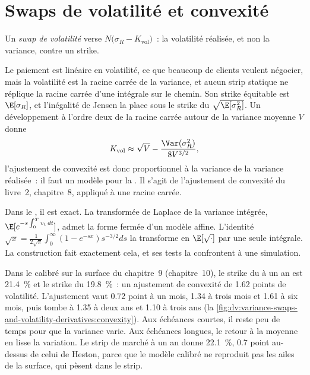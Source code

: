 \section{Swaps de volatilité et convexité}

\begin{definition}\label{def:dv:variance-swaps-and-volatility-derivatives:volswap}
Un \emph{swap de volatilité} verse $N\bigl(\sigma_R-K_{\mathrm{vol}}\bigr)$~: la volatilité
réalisée, et non la variance, contre un strike.
\end{definition}

Le paiement est linéaire en volatilité, ce que beaucoup de clients veulent négocier, mais la volatilité est la racine
carrée de la variance, et aucun strip statique ne réplique la racine carrée d'une intégrale sur le chemin. Son strike équitable est
$\E[\sigma_R]$, et l'inégalité de Jensen la place sous le strike du  $\sqrt{\E[\sigma_R^2]}$. Un
développement à l'ordre deux de la racine carrée autour de la variance moyenne $V$ donne
\[
K_{\mathrm{vol}}\approx\sqrt V-\frac{\Var(\sigma_R^2)}{8V^{3/2}},
\]
l'ajustement de convexité est donc proportionnel à la variance de la variance réalisée~: il faut un modèle pour la
. Il s'agit de l'ajustement de convexité du livre~2, chapitre~8, appliqué à une
racine carrée.

Dans le , il est exact. La transformée de Laplace de la variance intégrée,
$\E[e^{-s\int_0^Tv_t\,dt}]$, admet la forme fermée d'un modèle affine. L'identité
$\sqrt x=\frac1{2\sqrt\pi}\int_0^\infty(1-e^{-sx})s^{-3/2}ds$ la transforme en $\E[\sqrt{\cdot}]$ par une
seule intégrale. La construction fait exactement cela, et ses tests la confrontent à une simulation.

\begin{example}\label{ex:dv:variance-swaps-and-volatility-derivatives:convexity}
Dans le  calibré sur la surface du chapitre~9 (chapitre~10), le strike du  à un an est
21.4~\% et le strike du  19.8~\%~: un ajustement de convexité de 1.62 points de volatilité. L'ajustement
vaut 0.72 point à un mois, 1.34 à trois mois et 1.61 à six mois, puis tombe à 1.35 à deux ans et 1.10
à trois ans (la \cref{fig:dv:variance-swaps-and-volatility-derivatives:convexity}). Aux échéances courtes, il reste peu
de temps pour que la variance varie. Aux échéances longues, le retour à la moyenne en lisse la variation. Le strip de marché
à un an donne 22.1~\%, 0.7 point au-dessus de celui de Heston, parce que le modèle calibré ne reproduit pas
les ailes de la surface, qui pèsent dans le strip.
\end{example}

